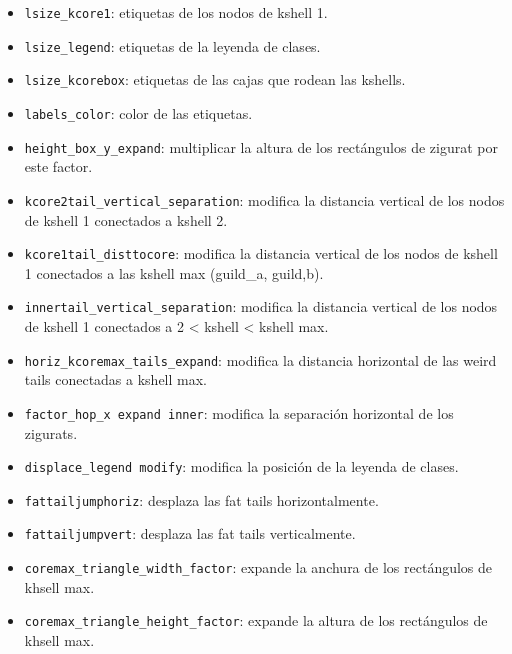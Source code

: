 \begin{itemize}
\item \texttt{lsize\_kcore1}: etiquetas de los nodos de kshell 1.

\item \texttt{lsize\_legend}: etiquetas de la leyenda de clases.

\item \texttt{lsize\_kcorebox}: etiquetas de las cajas que rodean las kshells.

\item \texttt{labels\_color}: color de las etiquetas.

\item \texttt{height\_box\_y\_expand}: multiplicar la altura de los rectángulos de zigurat por este factor.

\item \texttt{kcore2tail\_vertical\_separation}: modifica la distancia vertical de los nodos de kshell 1 conectados a kshell 2.

\item \texttt{kcore1tail\_disttocore}:  modifica la distancia vertical de los nodos de kshell 1 conectados a las kshell max (guild\_a, guild,b).

\item \texttt{innertail\_vertical\_separation}: modifica la distancia vertical de los nodos de kshell 1 conectados a 2 < kshell < kshell max.

\item \texttt{horiz\_kcoremax\_tails\_expand}: modifica la distancia horizontal de las weird tails conectadas a kshell max.

\item \texttt{factor\_hop\_x expand inner}: modifica la separación horizontal de los zigurats.

\item \texttt{displace\_legend modify}: modifica la posición de la leyenda de clases.

\item \texttt{fattailjumphoriz}: desplaza las fat tails horizontalmente.

\item \texttt{fattailjumpvert}: desplaza las fat tails verticalmente.

\item \texttt{coremax\_triangle\_width\_factor}: expande la anchura de los rectángulos de khsell max.

\item \texttt{coremax\_triangle\_height\_factor}: expande la altura de los rectángulos de khsell max.


\end{itemize}
